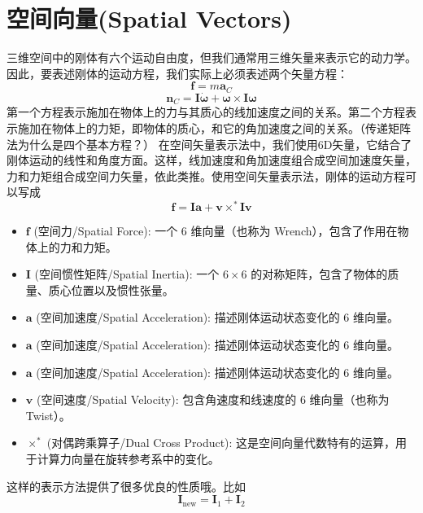 \section{空间向量(Spatial Vectors)}
三维空间中的刚体有六个运动自由度，但我们通常用三维矢量来表示它的动力学。因此，要表述刚体的运动方程，我们实际上必须表述两个矢量方程：
$$\mathbf{f}=m\mathbf{a}_C$$
$$\mathbf{n}_C=\mathbf{I}\dot{\mathbf{\omega}}+\mathbf{\omega} \times \mathbf{I}\mathbf{\omega}$$
第一个方程表示施加在物体上的力与其质心的线加速度之间的关系。第二个方程表示施加在物体上的力矩，即物体的质心，和它的角加速度之间的关系。（传递矩阵法为什么是四个基本方程？）
在空间矢量表示法中，我们使用6D矢量，它结合了刚体运动的线性和角度方面。这样，线加速度和角加速度组合成空间加速度矢量，力和力矩组合成空间力矢量，依此类推。使用空间矢量表示法，刚体的运动方程可以写成
$$\boldsymbol{f} = \mathbf{I}\boldsymbol{a} + \boldsymbol{v} \times^* \mathbf{I}\boldsymbol{v}$$
\begin{itemize}
    \item $\boldsymbol{f}$ (空间力/Spatial Force): 一个 6 维向量（也称为 Wrench），包含了作用在物体上的力和力矩。
    \item $\mathbf{I}$ (空间惯性矩阵/Spatial Inertia): 一个 $6 \times 6$ 的对称矩阵，包含了物体的质量、质心位置以及惯性张量。
    \item $\boldsymbol{a}$ (空间加速度/Spatial Acceleration): 描述刚体运动状态变化的 6 维向量。
    \item $\boldsymbol{a}$ (空间加速度/Spatial Acceleration): 描述刚体运动状态变化的 6 维向量。
    \item $\boldsymbol{a}$ (空间加速度/Spatial Acceleration): 描述刚体运动状态变化的 6 维向量。
    \item $\boldsymbol{v}$ (空间速度/Spatial Velocity): 包含角速度和线速度的 6 维向量（也称为 Twist）。
    \item $\times^*$ (对偶跨乘算子/Dual Cross Product): 这是空间向量代数特有的运算，用于计算力向量在旋转参考系中的变化。
\end{itemize}
这样的表示方法提供了很多优良的性质哦。比如$$\mathbf{I}_\text{new}=\mathbf{I}_1+\mathbf{I}_2$$